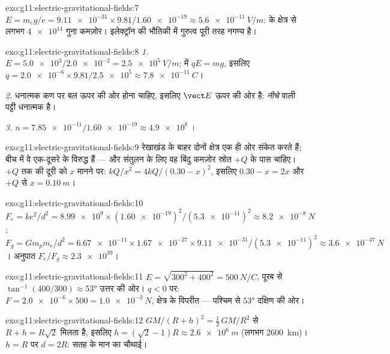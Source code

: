 \begin{solution}{exo:g11:electric-gravitational-fields:7}
$E = m_e g / e = \num{9.11e-31} \times 9.81 / \num{1.60e-19}
\approx \qty{5.6e-11}{V/m}$:  के क्षेत्र से लगभग $\num{4e14}$ गुना कमज़ोर।
इलेक्ट्रॉन की भौतिकी में गुरुत्व पूरी तरह नगण्य है।
\end{solution}

\begin{solution}{exo:g11:electric-gravitational-fields:8}
\emph{1.} $E = \num{5.0e3} / \num{2.0e-2} = \qty{2.5e5}{V/m}$;  में $qE = mg$, इसलिए $q = \num{2.0e-6} \times 9.81 / \num{2.5e5} \approx \qty{7.8e-11}{C}$।

\emph{2.} धनात्मक कण पर बल ऊपर की ओर होना चाहिए, इसलिए $\vect E$ ऊपर की
ओर है: \emph{नीचे} वाली पट्टी धनात्मक है।

\emph{3.} $n = \num{7.85e-11} / \num{1.60e-19} \approx \num{4.9e8}$ ।
\end{solution}

\begin{solution}{exo:g11:electric-gravitational-fields:9}
रेखाखंड के बाहर दोनों क्षेत्र एक ही ओर संकेत करते हैं; बीच में वे
एक-दूसरे के विरुद्ध हैं --- और संतुलन के लिए वह बिंदु कमज़ोर स्रोत $+Q$ के
पास चाहिए। $+Q$ तक की दूरी को $x$ मानने पर: $kQ/x^2 = 4kQ/(0.30 - x)^2$, इसलिए $0.30 - x = 2x$ और
$+Q$ से $x = \qty{0.10}{m}$।
\end{solution}

\begin{solution}{exo:g11:electric-gravitational-fields:10}
$F_e = ke^2/d^2 = \num{8.99e9} \times (\num{1.60e-19})^2 /
(\num{5.3e-11})^2 \approx \qty{8.2e-8}{N}$; $F_g = G m_p m_e / d^2 = \num{6.67e-11} \times \num{1.67e-27} \times
\num{9.11e-31} / (\num{5.3e-11})^2 \approx \qty{3.6e-47}{N}$। अनुपात $F_e / F_g \approx \num{2.3e39}$।
\end{solution}

\begin{solution}{exo:g11:electric-gravitational-fields:11}
$E = \sqrt{300^2 + 400^2} = \qty{500}{N/C}$, पूरब से $\tan^{-1}(400/300) \approx \ang{53}$ उत्तर की ओर। $q < 0$ पर: $F = \num{2.0e-6} \times 500 = \qty{1.0e-3}{N}$, क्षेत्र के
विपरीत --- पश्चिम से $\ang{53}$ दक्षिण की ओर।
\end{solution}

\begin{solution}{exo:g11:electric-gravitational-fields:12}
$GM/(R+h)^2 = \tfrac12\,GM/R^2$ से $R + h = R\sqrt{2}$ मिलता है, इसलिए $h = (\sqrt{2} - 1)R \approx \qty{2.6e6}{m}$ (लगभग \qty{2600}{km})। $h = R$ पर $d = 2R$:
सतह के मान का चौथाई।
\end{solution}

